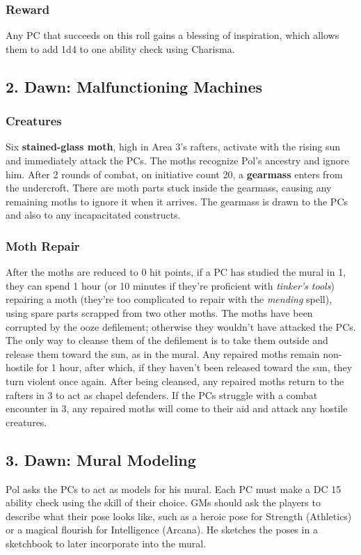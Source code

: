 \documentclass[10pt,a4paper,twoside,bg=print,twocolumn,openany,nodeprecatedcode]{dndbook}
\begin{document}
\subsubsection{Reward}
Any PC that succeeds on this roll gains a blessing of inspiration, which allows them to add 1d4 to one ability check using Charisma.

\subsection{2. Dawn: Malfunctioning Machines}
\subsubsection{Creatures}
Six \textbf{stained-glass moth}, high in Area 3's rafters, activate with the rising sun and immediately attack the PCs. The moths recognize Pol's ancestry and ignore him. After 2 rounds of combat, on initiative count 20, a \textbf{gearmass} enters from the undercroft. There are moth parts stuck inside the gearmass, causing any remaining moths to ignore it when it arrives. The gearmass is drawn to the PCs and also to any incapacitated constructs.

\subsubsection{Moth Repair}
After the moths are reduced to 0 hit points, if a PC has studied the mural in 1, they can spend 1 hour (or 10 minutes if they're proficient with \textit{tinker's tools}) repairing a moth (they're too complicated to repair with the \textit{mending} spell), using spare parts scrapped from two other moths. The moths have been corrupted by the ooze defilement; otherwise they wouldn't have attacked the PCs. The only way to cleanse them of the defilement is to take them outside and release them toward the sun, as in the mural. Any repaired moths remain non-hostile for 1 hour, after which, if they haven't been released toward the sun, they turn violent once again. After being cleansed, any repaired moths return to the rafters in 3 to act as chapel defenders. If the PCs struggle with a combat encounter in 3, any repaired moths will come to their aid and attack any hostile creatures.

\subsection{3. Dawn: Mural Modeling}
Pol asks the PCs to act as models for his mural. Each PC must make a DC 15 ability check using the skill of their choice. GMs should ask the players to describe what their pose looks like, such as a heroic pose for Strength (Athletics) or a magical flourish for Intelligence (Arcana). He sketches the poses in a sketchbook to later incorporate into the mural.
\end{document}
